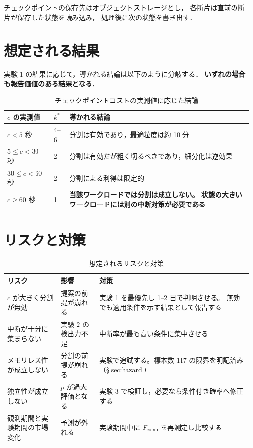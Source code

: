 \documentclass[11pt,a4paper]{ltjsreport}
\newcommand{\Fcomp}{F_{\mathrm{comp}}}
\begin{document}
チェックポイントの保存先はオブジェクトストレージとし，
各断片は直前の断片が保存した状態を読み込み，
処理後に次の状態を書き出す．

\section{想定される結果}

実験 1 の結果に応じて，導かれる結論は以下のように分岐する．
\textbf{いずれの場合も報告価値のある結果となる}．

\begin{table}[htbp]
\centering
\caption{チェックポイントコストの実測値に応じた結論}
\label{tab:outcomes}
\small
\begin{tabularx}{\textwidth}{@{}llX@{}}
\toprule
$c$ の実測値 & $k^{*}$ & 導かれる結論 \\
\midrule
$c < 5$ 秒 & 4--6
  & 分割は有効であり，最適粒度は約 10 分 \\
\addlinespace
$5 \leq c < 30$ 秒 & 2
  & 分割は有効だが粗く切るべきであり，細分化は逆効果 \\
\addlinespace
$30 \leq c < 60$ 秒 & 2
  & 分割による利得は限定的 \\
\addlinespace
$c \geq 60$ 秒 & 1
  & \textbf{当該ワークロードでは分割は成立しない。
    状態の大きいワークロードには別の中断対策が必要である} \\
\bottomrule
\end{tabularx}
\end{table}

\section{リスクと対策}

\begin{table}[htbp]
\centering
\caption{想定されるリスクと対策}
\label{tab:risks}
\small
\begin{tabularx}{\textwidth}{@{}XXX@{}}
\toprule
リスク & 影響 & 対策 \\
\midrule
$c$ が大きく分割が無効
  & 提案の前提が崩れる
  & 実験 1 を最優先し 1--2 日で判明させる。
    無効でも適用条件を示す結果として報告する \\
\addlinespace
中断が十分に集まらない
  & 実験 2 の検出力不足
  & 中断率が最も高い条件に集中させる \\
\addlinespace
メモリレス性が成立しない
  & 分割の前提が崩れる
  & 実験で追試する。標本数 117 の限界を明記済み
    （\S\ref{sec:hazard}） \\
\addlinespace
独立性が成立しない
  & $p$ が過大評価となる
  & 実験 3 で検証し，必要なら条件付き確率へ修正する \\
\addlinespace
観測期間と実験期間の市場変化
  & 予測が外れる
  & 実験期間中に $\Fcomp$ を再測定し比較する \\
\bottomrule
\end{tabularx}
\end{table}
\end{document}
